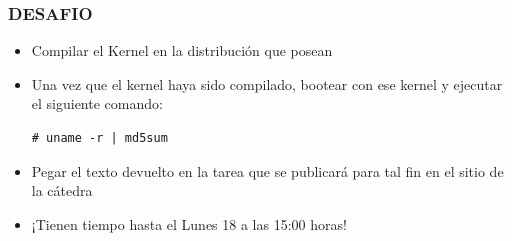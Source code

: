 \begin{frame}[fragile]
\frametitle{DESAFIO}
   \begin{itemize}  
   \item Compilar el Kernel en la distribución que posean
   \item Una vez que el kernel haya sido compilado, bootear con ese kernel y ejecutar el siguiente comando:
   \begin{lstlisting}
# uname -r | md5sum
    \end{lstlisting}
    \item Pegar el texto devuelto en la tarea que se publicará para tal fin en el sitio de la cátedra
    \item ¡Tienen tiempo hasta el Lunes 18 a las 15:00 horas!
 \end{itemize}
\end{frame}
